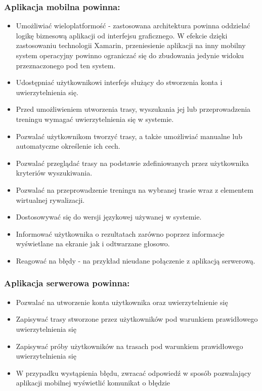 \subsubsection{Aplikacja mobilna powinna:}
\begin{itemize}
\item{Umożliwiać wieloplatformość} - zastosowana architektura powinna oddzielać logikę biznesową aplikacji od interfejsu graficznego. W efekcie dzięki zastosowaniu technologii Xamarin, przeniesienie aplikacji na inny mobilny system operacyjny powinno ograniczać się do zbudowania jedynie widoku przeznaczonego pod ten system.
\item{Udostępniać użytkownikowi interfejs służący do stworzenia konta i uwierzytelnienia się.}
\item{Przed umożliwieniem utworzenia trasy, wyszukania jej lub przeprowadzenia treningu wymagać uwierzytelnienia się w systemie.}
\item{Pozwalać użytkownikom tworzyć trasy, a także umożliwiać manualne lub automatyczne określenie ich cech.}
\item{Pozwalać przeglądać trasy na podstawie zdefiniowanych przez użytkownika kryteriów wyszukiwania.}
\item{Pozwalać na przeprowadzenie treningu na wybranej trasie wraz z elementem wirtualnej rywalizacji.}
\item{Dostosowywać się do wersji językowej używanej w systemie.}
\item{Informować użytkownika o rezultatach zarówno poprzez informacje wyświetlane na ekranie jak i odtwarzane głosowo.}
\item{Reagować na błędy - na przykład nieudane połączenie z aplikacją serwerową.}
\end{itemize}

\subsubsection{Aplikacja serwerowa powinna:}
\begin{itemize}
\item{Pozwalać na utworzenie konta użytkownika oraz uwierzytelnienie się}
\item{Zapisywać trasy stworzone przez użytkowników pod warunkiem prawidłowego uwierzytelnienia się}
\item{Zapisywać próby użytkowników na trasach pod warunkiem prawidłowego uwierzytelnienia się}
\item{W przypadku wystąpienia błędu, zwracać odpowiedź w sposób pozwalający aplikacji mobilnej wyświetlić komunikat o błędzie}
\end{itemize}

